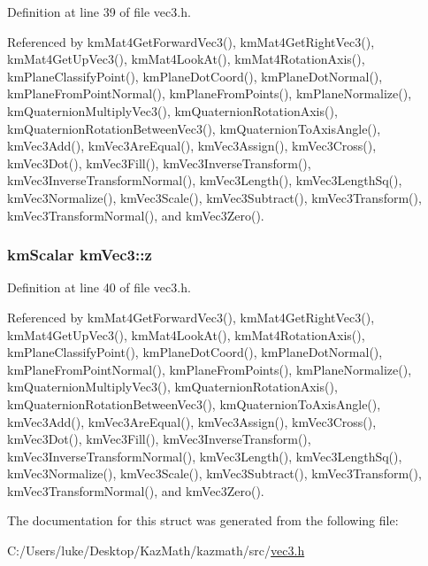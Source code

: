Definition at line 39 of file vec3.h.

Referenced by kmMat4GetForwardVec3(), kmMat4GetRightVec3(), kmMat4GetUpVec3(), kmMat4LookAt(), kmMat4RotationAxis(), kmPlaneClassifyPoint(), kmPlaneDotCoord(), kmPlaneDotNormal(), kmPlaneFromPointNormal(), kmPlaneFromPoints(), kmPlaneNormalize(), kmQuaternionMultiplyVec3(), kmQuaternionRotationAxis(), kmQuaternionRotationBetweenVec3(), kmQuaternionToAxisAngle(), kmVec3Add(), kmVec3AreEqual(), kmVec3Assign(), kmVec3Cross(), kmVec3Dot(), kmVec3Fill(), kmVec3InverseTransform(), kmVec3InverseTransformNormal(), kmVec3Length(), kmVec3LengthSq(), kmVec3Normalize(), kmVec3Scale(), kmVec3Subtract(), kmVec3Transform(), kmVec3TransformNormal(), and kmVec3Zero().\hypertarget{structkm_vec3_539514eaeee81aaeee3bb90f7a1581af}{
\subsubsection[{z}]{\setlength{\rightskip}{0pt plus 5cm}kmScalar {\bf kmVec3::z}}}
\label{structkm_vec3_539514eaeee81aaeee3bb90f7a1581af}




Definition at line 40 of file vec3.h.

Referenced by kmMat4GetForwardVec3(), kmMat4GetRightVec3(), kmMat4GetUpVec3(), kmMat4LookAt(), kmMat4RotationAxis(), kmPlaneClassifyPoint(), kmPlaneDotCoord(), kmPlaneDotNormal(), kmPlaneFromPointNormal(), kmPlaneFromPoints(), kmPlaneNormalize(), kmQuaternionMultiplyVec3(), kmQuaternionRotationAxis(), kmQuaternionRotationBetweenVec3(), kmQuaternionToAxisAngle(), kmVec3Add(), kmVec3AreEqual(), kmVec3Assign(), kmVec3Cross(), kmVec3Dot(), kmVec3Fill(), kmVec3InverseTransform(), kmVec3InverseTransformNormal(), kmVec3Length(), kmVec3LengthSq(), kmVec3Normalize(), kmVec3Scale(), kmVec3Subtract(), kmVec3Transform(), kmVec3TransformNormal(), and kmVec3Zero().

The documentation for this struct was generated from the following file:\begin{CompactItemize}
\item 
C:/Users/luke/Desktop/KazMath/kazmath/src/\hyperlink{vec3_8h}{vec3.h}\end{CompactItemize}
